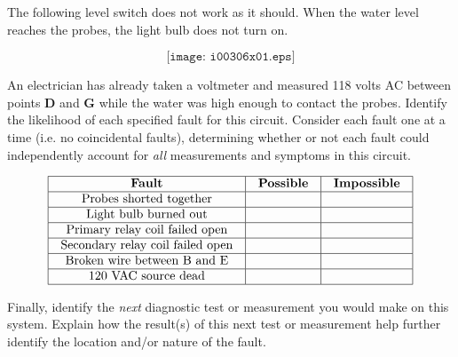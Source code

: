 

The following level switch does not work as it should.  When the water level reaches the probes, the light bulb does not turn on.  

$$\texttt{[image: i00306x01.eps]}$$

An electrician has already taken a voltmeter and measured 118 volts AC between points {\bf D} and {\bf G} while the water was high enough to contact the probes.  Identify the likelihood of each specified fault for this circuit.  Consider each fault one at a time (i.e. no coincidental faults), determining whether or not each fault could independently account for {\it all} measurements and symptoms in this circuit.


$$\vbox{\offinterlineskip
\halign{\strut
\vrule \quad\hfil # \ \hfil & 
\vrule \quad\hfil # \ \hfil & 
\vrule \quad\hfil # \ \hfil \vrule \cr
\noalign{\hrule}
%
{\bf Fault} & {\bf Possible} & {\bf Impossible} \cr
%
\noalign{\hrule}
%
Probes shorted together &  &  \cr
%
\noalign{\hrule}
%
Light bulb burned out &  &  \cr
%
\noalign{\hrule}
%
Primary relay coil failed open &  &  \cr
%
\noalign{\hrule}
%
Secondary relay coil failed open &  &  \cr
%
\noalign{\hrule}
%
Broken wire between B and E &  &  \cr
%
\noalign{\hrule}
%
120 VAC source dead &  &  \cr
%
\noalign{\hrule}
} %
}$$ %

Finally, identify the {\it next} diagnostic test or measurement you would make on this system.  Explain how the result(s) of this next test or measurement help further identify the location and/or nature of the fault.















